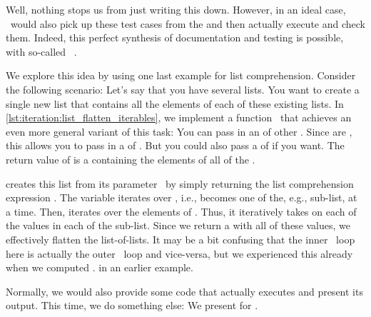 Well, nothing stops us from just writing this down.
However, in an ideal case, \pytest\ would also pick up these test cases from the  and then actually execute and check them.
Indeed, this perfect synthesis of documentation and testing is possible, with so-called ~\cite{PSF:P3D:TPSL:DTIPE}.

We explore this idea by using one last example for list comprehension.
Consider the following scenario:
Let's say that you have several lists.
You want to create a single new list that contains all the elements of each of these existing lists.
In \cref{lst:iteration:list_flatten_iterables}, we implement a function~ that achieves an even more general variant of this task:
You can pass in an  of other .
Since  are , this allows you to pass in a  of .
But you could also pass a  of  if you want.
The return value of  is a  containing the elements of all of the  .%
%
\begin{sloppypar}%
 creates this list from its parameter~ by simply returning the list comprehension expression .
The variable  iterates over , i.e., becomes one of the, e.g., sub-list, at a time.
Then,  iterates over the elements of .
Thus, it iteratively takes on each of the values in each of the sub-list.
Since we return a  with all of these values, we effectively flatten the list-of-lists.
It may be a bit confusing that the inner ~loop here is actually the outer ~loop and vice-versa, but we experienced this already when we computed . in an earlier example.%
\end{sloppypar}%
%
Normally, we would also provide some code that actually executes  and present its output.
This time, we do something else:
We present  for .

